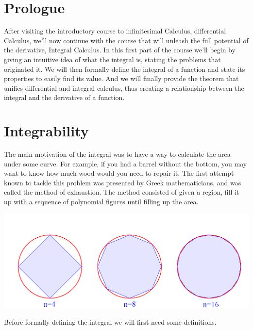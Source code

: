 \documentclass{report}
\begin{document}
    \tableofcontents

    \chapter*{Prologue}
    After visiting the introductory course to infinitesimal Calculus, differential Calculus, we'll now continue with the course that will unleash the full potential of the derivative, Integral Calculus. In this first part of the course we'll begin by giving an intuitive idea of what the integral is, stating the problems that originated it. We will then formally define the integral of a function and state its properties to easily find its value. And we will finally provide the theorem that unifies differential and integral calculus, thus creating a relationship between the integral and the derivative of a function.

    \pagebreak
    \chapter{ Integrability }
    The main motivation of the integral was to have a way to calculate the area under some curve. For example, if you had a barrel without the bottom, you may want to know how much wood would you need to repair it. The first attempt known to tackle this problem was presented by Greek mathematicians, and was called the method of exhaustion. The method consisted of given a region, fill it up with a sequence of polynomial figures until filling up the area.

    \begin{Figure}
        \begin{center}
        \includegraphics[width=1\textwidth]{images/exhaustion.png}
        \end{center}
    \end{Figure}

    Before formally defining the integral we will first need some definitions.
\end{document}
